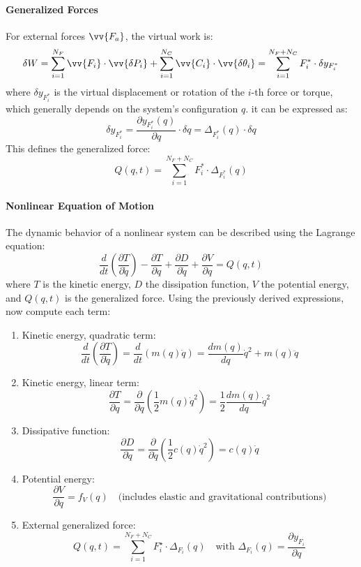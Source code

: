 \paragraph{Generalized Forces} For external forces \( \vv{F_a} \), the virtual work is:
\[
\delta W = \sum_{i=1}^{N_F} \vv{F_i} \cdot \vv{\delta P_i} + \sum_{i=1}^{N_C} \vv{C_i} \cdot \vv{\delta \theta_i} = \sum_{i=1}^{N_F + N_C} F_i^* \cdot \delta y_{F_i^*}
\]
where \( \delta y_{F_i^*} \) is the virtual displacement or rotation of the \( i \)-th force or torque, which generally depends on the system’s configuration \( q \). it can be expressed as:
\[
\delta y_{F_i^*} = \frac{\partial y_{F_i^*}(q)}{\partial q} \cdot \delta q = \Delta_{F_i^*}(q) \cdot \delta q
\]
This defines the generalized force:
\[
Q(q,t) = \sum_{i=1}^{N_F + N_C} F_i^* \cdot \Delta_{F_i^*}(q)
\]

\paragraph{Nonlinear Equation of Motion}

The dynamic behavior of a nonlinear system can be described using the Lagrange equation:
\[
\frac{d}{dt} \left( \frac{\partial T}{\partial \dot{q}} \right) - \frac{\partial T}{\partial q}
+ \frac{\partial D}{\partial \dot{q}} + \frac{\partial V}{\partial q} = Q(q,t)
\]
where \( T \) is the kinetic energy, \( D \) the dissipation function, \( V \) the potential energy, and \( Q(q,t) \) is the generalized force. Using the previously derived expressions, now compute each term:

\begin{enumerate}
    \item Kinetic energy, quadratic term:
    \[
    \frac{d}{dt} \left( \frac{\partial T}{\partial \dot{q}} \right) = \frac{d}{dt} \left( m(q) \dot{q} \right) = \frac{d m(q)}{d q} \dot{q}^2 + m(q) \ddot{q}
    \]
    \item Kinetic energy, linear term:
    \[
    \frac{\partial T}{\partial q} = \frac{\partial}{\partial q} \left( \frac{1}{2} m(q) \dot{q}^2 \right) = \frac{1}{2} \frac{d m(q)}{d q} \dot{q}^2
    \]
    \item Dissipative function:
    \[
    \frac{\partial D}{\partial \dot{q}} = \frac{\partial}{\partial \dot{q}} \left( \frac{1}{2} c(q) \dot{q}^2 \right) = c(q) \dot{q}
    \]
    \item Potential energy:
    \[
    \frac{\partial V}{\partial q} = f_V(q) \quad \text{(includes elastic and gravitational contributions)}
    \]
    \item External generalized force:
    \[
    Q(q,t) = \sum_{i=1}^{N_F + N_C} F_i^\star \cdot \Delta_{F_i}(q) \quad \text{with } \Delta_{F_i}(q) = \frac{\partial y_{F_i}}{\partial q}
    \]
\end{enumerate}

